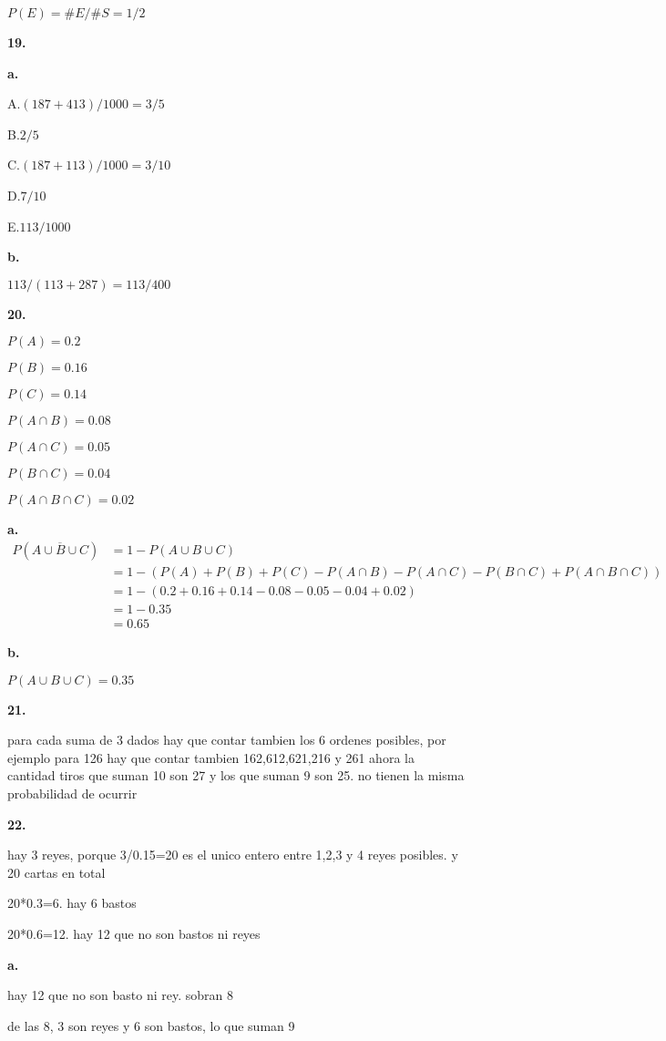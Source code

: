 \documentclass[12pt]{article}
\begin{document}
$P(E)=\#E/\#S=1/2$

\textbf{19.}

\textbf{a.}

A.$(187+413)/1000=3/5$

B.$2/5$

C.$(187+113)/1000=3/10$

D.$7/10$

E.$113/1000$

\textbf{b.}

$113/(113+287)=113/400$

\textbf{20.}

$P(A)=0.2$

$P(B)=0.16$

$P(C)=0.14$

$P(A \cap B)=0.08$

$P(A \cap C)=0.05$

$P(B \cap C)=0.04$

$P(A \cap B \cap C)=0.02$

\textbf{a.}
\begin{align*}
  P(\overline{A \cup B \cup C})&=1-P(A \cup B \cup C)\\
             &=1-(P(A)+P(B)+P(C)-P(A \cap B)-P(A \cap C)-P(B \cap C)+P(A \cap B \cap C))\\
             &=1-(0.2+0.16+0.14-0.08-0.05-0.04+0.02)\\
             &=1-0.35\\
             &=0.65
\end{align*}

\textbf{b.}

$P(A \cup B \cup C)=0.35$

\textbf{21.}

para cada suma de 3 dados hay que contar tambien los 6 ordenes posibles, por ejemplo para 126 hay que contar tambien 162,612,621,216 y 261
ahora la cantidad tiros que suman 10 son 27 y los que suman 9 son 25. no tienen la misma probabilidad de ocurrir

\textbf{22.}

hay 3 reyes, porque 3/0.15=20 es el unico entero entre 1,2,3 y 4 reyes posibles. y 20 cartas en total

20*0.3=6. hay 6 bastos

20*0.6=12. hay 12 que no son bastos ni reyes

\textbf{a.}

hay 12 que no son basto ni rey. sobran 8

de las 8, 3 son reyes y 6 son bastos, lo que suman 9
\end{document}
